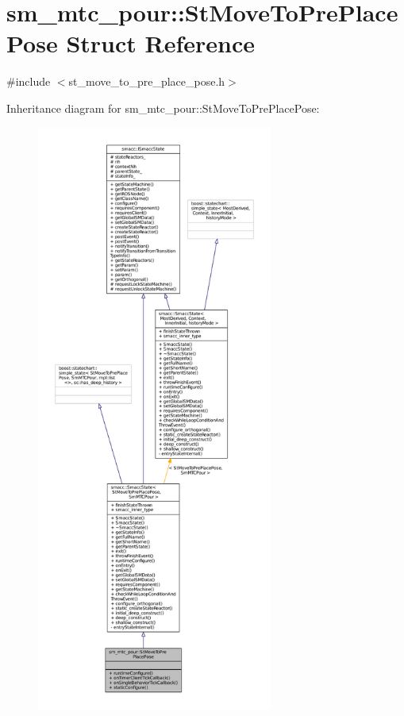 \hypertarget{structsm__mtc__pour_1_1StMoveToPrePlacePose}{}\section{sm\+\_\+mtc\+\_\+pour\+:\+:St\+Move\+To\+Pre\+Place\+Pose Struct Reference}
\label{structsm__mtc__pour_1_1StMoveToPrePlacePose}


{\ttfamily \#include $<$st\+\_\+move\+\_\+to\+\_\+pre\+\_\+place\+\_\+pose.\+h$>$}



Inheritance diagram for sm\+\_\+mtc\+\_\+pour\+:\+:St\+Move\+To\+Pre\+Place\+Pose\+:
\nopagebreak
\begin{figure}[H]
\begin{center}
\leavevmode
\includegraphics[height=550pt]{structsm__mtc__pour_1_1StMoveToPrePlacePose__inherit__graph}
\end{center}
\end{figure}


